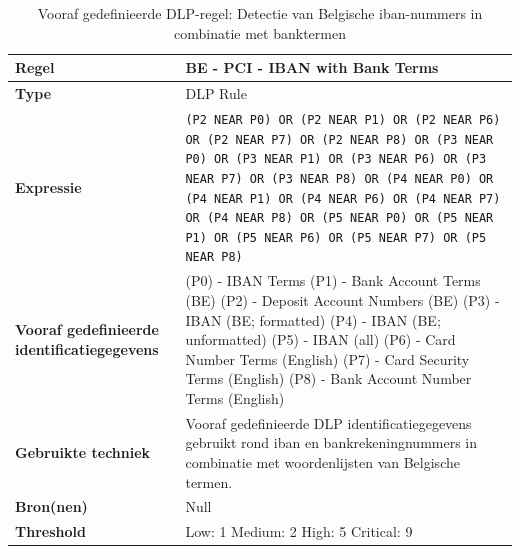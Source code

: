 \begin{table}[H]
    \centering
    \small
    \scriptsize
    \begin{tabular}{p{4cm} p{10cm}}
        \toprule
        \textbf{Regel} & BE \-- PCI \-- IBAN with Bank Terms \\
        \midrule
        \textbf{Type} & DLP Rule \\
        \textbf{Expressie} & \texttt{(P2 NEAR P0) OR (P2 NEAR P1) OR (P2 NEAR P6) OR (P2 NEAR P7) OR (P2 NEAR P8) OR (P3 NEAR P0) OR (P3 NEAR P1) OR (P3 NEAR P6) OR (P3 NEAR P7) OR (P3 NEAR P8) OR (P4 NEAR P0) OR (P4 NEAR P1) OR (P4 NEAR P6) OR (P4 NEAR P7) OR (P4 NEAR P8) OR (P5 NEAR P0) OR (P5 NEAR P1) OR (P5 NEAR P6) OR (P5 NEAR P7) OR (P5 NEAR P8)} \\
        \textbf{Vooraf gedefinieerde identificatiegegevens} & 
        (P0) \-- IBAN Terms \newline 
        (P1) \-- Bank Account Terms (BE) \newline
        (P2) \-- Deposit Account Numbers (BE) \newline
        (P3) \-- IBAN (BE; formatted) \newline
        (P4) \-- IBAN (BE; unformatted) \newline
        (P5) \-- IBAN (all) \newline
        (P6) \-- Card Number Terms (English) \newline
        (P7) \-- Card Security Terms (English) \newline
        (P8) \-- Bank Account Number Terms (English) \\
        \textbf{Gebruikte techniek} & Vooraf gedefinieerde DLP identificatiegegevens gebruikt rond \gls{iban} en bankrekeningnummers in combinatie met woordenlijsten van Belgische termen. \\
        \textbf{Bron(nen)} & Null \\
        \textbf{Threshold} & Low: 1 \quad Medium: 2 \quad High: 5 \quad Critical: 9 \\
        \bottomrule
    \end{tabular}
    \caption{Vooraf gedefinieerde DLP-regel: Detectie van Belgische \gls{iban}-nummers in combinatie met banktermen}
    \label{tab:custom-be-iban-terms}
\end{table}



